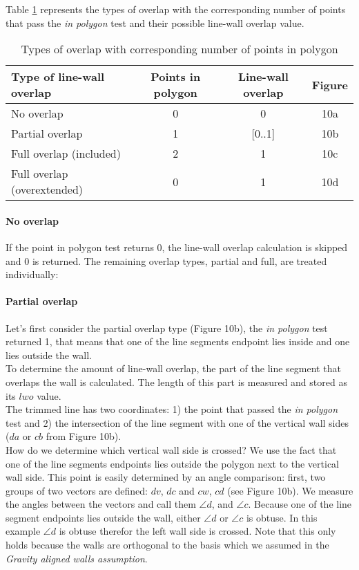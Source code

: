 	Table \ref{tab:lwatypes} represents the types of overlap with the corresponding number of points
	that pass the \emph{in polygon} test and their possible line-wall overlap
	value.\\ 

	\begin{table}[ht]
		\caption{Types of overlap with corresponding number of points in polygon}
		\label{tab:lwatypes}

		\begin{tabular}{|l||c|c|c|}
		\hline
		Type of line-wall overlap 			&	Points in polygon 			& Line-wall overlap & Figure \\
		\hline
		\hline
		No overlap					&	0					& 0		& 10a\\
		\hline
		Partial overlap 				&	1					& [0..1]	& 10b\\
		\hline
		Full overlap (included)		&	2					& 1		& 10c\\
		\hline
		Full overlap (overextended)		&  	0					& 1 		& 10d\\
		\hline
		\end{tabular}
	\end{table}

	\paragraph{No overlap}
	If the point in polygon test returns 0, the line-wall overlap calculation
	is skipped and 0 is returned. The remaining overlap types, partial and full,
	are treated individually:\\


	\paragraph{Partial overlap}
	Let's first consider the partial overlap type (Figure 10b), the \emph{in polygon} test
	returned 1, that means that one of the line segments endpoint lies inside
	and one lies outside the wall.\\
	To determine the amount of line-wall overlap, the part of the line segment
	that overlaps the wall is calculated. The length of this part is measured
	and stored as its $lwo$ value.\\
	The trimmed line has two coordinates: 1) the point that passed
	the \emph{in polygon} test and 2) the intersection of the line
	segment with one of the vertical wall sides ($da$ or $cb$ from Figure 10b).\\
	How do we determine which vertical wall side is crossed?
	We use the fact that one of the line segments endpoints lies outside the
	polygon next to the vertical wall side.
 	This point is easily determined by an angle comparison:
	first, two groups of two vectors are defined: $dv$, $dc$ and $cw$, $cd$ (see Figure 10b).
	We measure the angles between the vectors and call them $\angle d$, and
	$\angle c$.  Because one of the line segment endpoints lies outside
	the wall, either $\angle d$ or $\angle c$ is obtuse. In this example $\angle
	d$ is obtuse therefor the left wall side is crossed.
	Note that this only holds because the walls are orthogonal to the basis
	which we assumed in the \emph{Gravity aligned walls assumption}.\\

